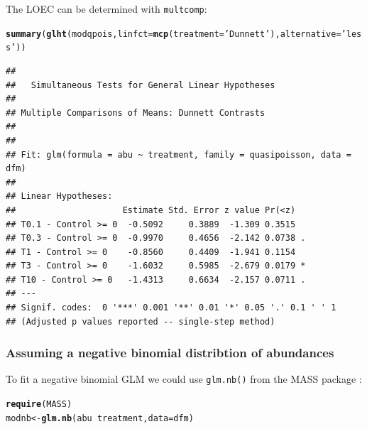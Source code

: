 \documentclass{scrartcl}\usepackage[]{graphicx}\usepackage[]{color}
\makeatletter
\newcommand{\hlstr}[1]{\textcolor[rgb]{0.192,0.494,0.8}{#1}}%
\newcommand{\hlopt}[1]{\textcolor[rgb]{0,0,0}{#1}}%
\newcommand{\hlstd}[1]{\textcolor[rgb]{0.345,0.345,0.345}{#1}}%
\newcommand{\hlkwb}[1]{\textcolor[rgb]{0.69,0.353,0.396}{#1}}%
\newcommand{\hlkwc}[1]{\textcolor[rgb]{0.333,0.667,0.333}{#1}}%
\newcommand{\hlkwd}[1]{\textcolor[rgb]{0.737,0.353,0.396}{\textbf{#1}}}%
\newenvironment{kframe}{%
 \def\at@end@of@kframe{}%
 \ifinner\ifhmode%
  \def\at@end@of@kframe{\end{minipage}}%
  \begin{minipage}{\columnwidth}%
 \fi\fi%
 \def\FrameCommand##1{\hskip\@totalleftmargin \hskip-\fboxsep
 \colorbox{shadecolor}{##1}\hskip-\fboxsep
     \hskip-\linewidth \hskip-\@totalleftmargin \hskip\columnwidth}%
 \MakeFramed {\advance\hsize-\width
   \@totalleftmargin\z@ \linewidth\hsize
   \@setminipage}}%
 {\par\unskip\endMakeFramed%
 \at@end@of@kframe}
\newenvironment{knitrout}{}{} %
\makeatother
\begin{document}
The LOEC can be determined with \texttt{multcomp}:
\begin{knitrout}
\color{fgcolor}\begin{kframe}
\begin{alltt}
\hlkwd{summary}\hlstd{(}\hlkwd{glht}\hlstd{(modqpois,} \hlkwc{linfct} \hlstd{=} \hlkwd{mcp}\hlstd{(}\hlkwc{treatment} \hlstd{=} \hlstr{'Dunnett'}\hlstd{),}  \hlkwc{alternative} \hlstd{=} \hlstr{'less'}\hlstd{))}
\end{alltt}
\begin{verbatim}
## 
## 	 Simultaneous Tests for General Linear Hypotheses
## 
## Multiple Comparisons of Means: Dunnett Contrasts
## 
## 
## Fit: glm(formula = abu ~ treatment, family = quasipoisson, data = dfm)
## 
## Linear Hypotheses:
##                     Estimate Std. Error z value Pr(<z)  
## T0.1 - Control >= 0  -0.5092     0.3889  -1.309 0.3515  
## T0.3 - Control >= 0  -0.9970     0.4656  -2.142 0.0738 .
## T1 - Control >= 0    -0.8560     0.4409  -1.941 0.1154  
## T3 - Control >= 0    -1.6032     0.5985  -2.679 0.0179 *
## T10 - Control >= 0   -1.4313     0.6634  -2.157 0.0711 .
## ---
## Signif. codes:  0 '***' 0.001 '**' 0.01 '*' 0.05 '.' 0.1 ' ' 1
## (Adjusted p values reported -- single-step method)
\end{verbatim}
\end{kframe}
\end{knitrout}



\subsubsection{Assuming a negative binomial distribtion of abundances}
To fit a negative binomial GLM we could use \texttt{glm.nb()} from the MASS package \citep{venables_modern_2002}:
\begin{knitrout}
\color{fgcolor}\begin{kframe}
\begin{alltt}
\hlkwd{require}\hlstd{(MASS)}
\hlstd{modnb} \hlkwb{<-} \hlkwd{glm.nb}\hlstd{(abu} \hlopt{~} \hlstd{treatment,} \hlkwc{data} \hlstd{= dfm)}
\end{alltt}
\end{kframe}
\end{knitrout}
\end{document}
